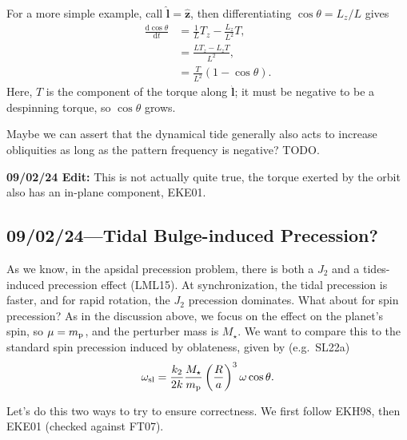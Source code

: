 \documentclass[12pt]{article}
\newcommand*{\rd}[2]{\frac{\mathrm{d}#1}{\mathrm{d}#2}}
\newcommand*{\bm}[1]{\boldsymbol{\mathbf{#1}}}
\newcommand*{\uv}[1]{\hat{\bm{#1}}}
\newcommand*{\p}[1]{\left(#1\right)}
\begin{document}
For a more simple example, call $\uv{l} = \uv{z}$, then differentiating
$\cos\theta = L_z / L$ gives
\begin{align}
    \rd{\cos\theta}{t} &= \frac{1}{L}T_z - \frac{L_z}{L^2}T,\\
        &= \frac{LT_z - L_zT}{L^2},\\
        &= \frac{T}{L^2}\p{1 - \cos\theta}.
\end{align}
Here, $T$ is the component of the torque along $\uv{l}$; it must be negative to
be a despinning torque, so $\cos\theta$ grows.

Maybe we can assert that the dynamical tide generally also acts to increase
obliquities as long as the pattern frequency is negative? TODO\@.

\textbf{09/02/24 Edit:} This is not actually quite true, the torque exerted by
the orbit also has an in-plane component, EKE01.

\subsection{09/02/24---Tidal Bulge-induced Precession?}

As we know, in the apsidal precession problem, there is both a $J_2$ and a
tides-induced precession effect (LML15). At synchronization, the tidal
precession is faster, and for rapid rotation, the $J_2$ precession dominates.
What about for spin precession? As in the discussion above, we focus on the
effect on the planet's spin, so $\mu = m_{\rm p}$, and the perturber mass is
$M_\star$. We want to compare this to the standard spin precession induced by
oblateness, given by (e.g.\ SL22a)
\begin{equation}
    \omega_{\rm sl}
        = \frac{k_2}{2k}\frac{M_\star}{m_{\rm p}}\p{\frac{R}{a}}^3
            \omega \cos \theta.
\end{equation}

Let's do this two ways to try to ensure correctness. We first follow EKH98, then
EKE01 (checked against FT07).
\end{document}
